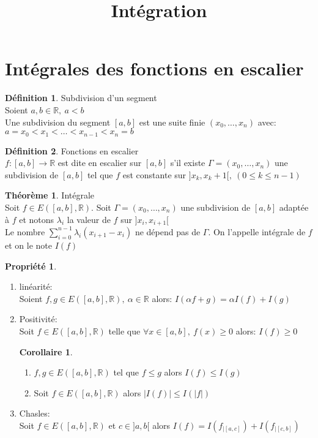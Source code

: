 \documentclass[fleqn]{article}
\title{Int\'egration}
\date{}
\theoremstyle{definition} \newtheorem*{defi}{D\'efinition}
\theoremstyle{definition} \newtheorem*{theo}{Th\'eor\`eme}
\theoremstyle{definition} \newtheorem*{coro}{Corollaire}
\theoremstyle{remark} \newtheorem*{rqs}{Remarques}
\theoremstyle{definition} \newtheorem*{prop}{Propri\'et\'e}
\begin{document}
\maketitle

\section{Int\'egrales des fonctions en escalier}
\begin{defi} Subdivision d'un segment\\
	Soient $a, b\in \mathbb{R},\ a<b$\\
	Une subdivision du segment $[a,b]$ est une suite finie $(x_0, \hdots, x_n)$ avec: \\ $a=x_0 < x_1 < \hdots < x_{n-1} <  x_n = b$
\end{defi}

\begin{defi} Fonctions en escalier\\
	$f: [a,b] \rightarrow \mathbb{R}$ est dite en escalier sur $[a,b]$ s'il existe $\Gamma = (x_0, \hdots, x_n)$ une subdivision de $[a,b]$
	tel que $f$ est constante sur $]x_k, x_k+1[,\ (0 \leq k \leq n-1)$
\end{defi}

\begin{theo} Int\'egrale \\
	Soit $f \in E([a,b], \mathbb{R})$. Soit $\Gamma = (x_0, \hdots, x_n)$ une subdivision de $[a,b]$ adapt\'ee \`a $f$ et notons $\lambda_i$
	la valeur de $f$ sur $]x_i, x_{i+1}[$ \\
	Le nombre $\sum_{i = 0}^{n-1} \lambda_i (x_{i+1} - x_i)$ ne d\'epend pas de $\Gamma$. On l'appelle int\'egrale de $f$ et on le note $I(f)$
\end{theo}

\begin{prop} $ $
	\begin{enumerate}
		\item lin\'earit\'e: \\
			Soient $f,g \in E([a,b], \mathbb{R}),\ \alpha \in \mathbb{R}$ alors: $I(\alpha f + g) = \alpha I(f) + I(g)$
		\item Positivit\'e: \\
			Soit $f \in E([a,b], \mathbb{R})$ telle que $\forall x \in [a,b],\ f(x) \geq 0$ alors: $I(f) \geq 0$
			\begin{coro} $ $
				\begin{enumerate}
					\item $f,g \in E([a,b], \mathbb{R})$ tel que $f \leq g$ alors $I(f) \leq I(g)$
					\item Soit $f \in E([a,b], \mathbb{R})$ alors $|I(f)| \leq I(|f|)$
				\end{enumerate}
			\end{coro}
		\item Chasles: \\
			Soit $f \in E([a,b], \mathbb{R})$ et $c \in ]a,b[$ alors $I(f) = I(f_{|[a,c]}) + I(f_{|[c,b]})$
	\end{enumerate}
\end{prop}
\end{document}
